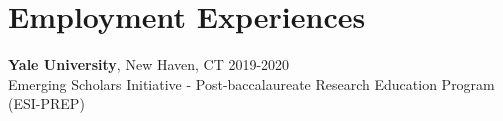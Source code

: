 
\section{Employment Experiences}
\vspace{-0.25in}
\begin{outerlist}
	\item \textbf{Yale University}, New Haven, CT \hfill 2019-2020 \\
	Emerging Scholars Initiative - Post-baccalaureate Research Education Program (ESI-PREP)
\end{outerlist}
